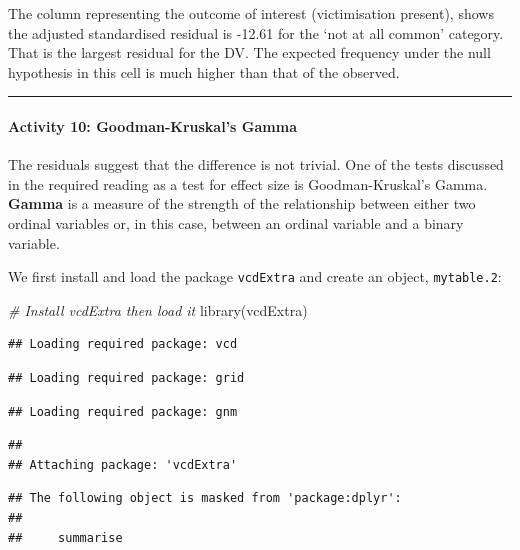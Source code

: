 \documentclass[
]{book}
\newenvironment{Shaded}{\begin{snugshade}}{\end{snugshade}}
\newcommand{\CommentTok}[1]{\textcolor[rgb]{0.56,0.35,0.01}{\textit{#1}}}
\newcommand{\FunctionTok}[1]{\textcolor[rgb]{0.00,0.00,0.00}{#1}}
\newcommand{\NormalTok}[1]{#1}
\begin{document}
The column representing the outcome of interest (victimisation present), shows the adjusted standardised residual is -12.61 for the `not at all common' category. That is the largest residual for the DV. The expected frequency under the null hypothesis in this cell is much higher than that of the observed.

\begin{center}\rule{0.5\linewidth}{0.5pt}\end{center}

\hypertarget{activity-10-goodman-kruskals-gamma}{%
\paragraph{Activity 10: Goodman-Kruskal's Gamma}\label{activity-10-goodman-kruskals-gamma}}

The residuals suggest that the difference is not trivial. One of the tests discussed in the required reading as a test for effect size is Goodman-Kruskal's Gamma. \textbf{Gamma} is a measure of the strength of the relationship between either two ordinal variables or, in this case, between an ordinal variable and a binary variable.

We first install and load the package \texttt{vcdExtra} and create an object, \texttt{mytable.2}:

\begin{Shaded}
\begin{Highlighting}[]
\CommentTok{\# Install \textquotesingle{}vcdExtra\textquotesingle{} then load it}
\FunctionTok{library}\NormalTok{(vcdExtra)}
\end{Highlighting}
\end{Shaded}

\begin{verbatim}
## Loading required package: vcd
\end{verbatim}

\begin{verbatim}
## Loading required package: grid
\end{verbatim}

\begin{verbatim}
## Loading required package: gnm
\end{verbatim}

\begin{verbatim}
## 
## Attaching package: 'vcdExtra'
\end{verbatim}

\begin{verbatim}
## The following object is masked from 'package:dplyr':
## 
##     summarise
\end{verbatim}
\end{document}
